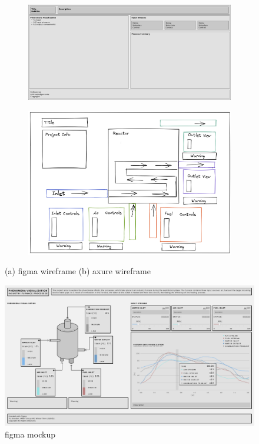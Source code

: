 \begin{figure}[ht]
    \centering
    \begin{subfigure}{0.5\textwidth}
        \centering
        \includegraphics[width=0.9\linewidth]{images/concept/wireframes/Wireframe_1_figma.png}
        \caption{}
    \end{subfigure}%
    \begin{subfigure}{0.5\textwidth}
        \centering
        \includegraphics[width=0.7\linewidth]{images/concept/wireframes/Wireframe_2_axure.png}
        \caption{}
    \end{subfigure}
    \caption { (a) figma wireframe (b) axure wireframe}
\label{fig:Wireframes}
\end{figure}

\begin{figure}[ht]
    \centering
    \includegraphics[width=0.6\linewidth]{images/concept/mockup/mockup_v1_figma.png}
    \caption{figma mockup}
    \label{fig:FigmaMockup}
\end{figure}

